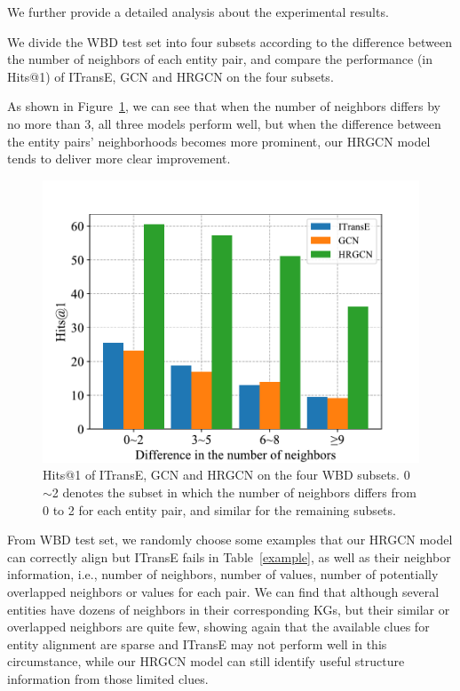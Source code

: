 	We further provide a detailed analysis about the experimental results.
	
	We divide the WBD test set into four subsets according to the difference between the number of neighbors of each entity pair, and compare the performance (in Hits@1) of ITransE, GCN and HRGCN on the four subsets.
	
	As shown in Figure~\ref{subset}, we can see that when the number of neighbors differs by no more than 3, all three models perform well,
	but when the difference between the entity pairs' neighborhoods becomes more prominent,
	our HRGCN model tends to deliver more clear improvement.
	\begin{figure}
		\centering
		\includegraphics[width=1\linewidth]{figures/graph4.pdf}
		\caption{Hits@1 of ITransE, GCN and HRGCN on the four WBD subsets. 0$\sim$2 denotes the subset in which the number of neighbors differs from 0 to 2 for each entity pair, and similar for the remaining subsets.}
		\label{subset}
	\end{figure}
	From WBD test set, we randomly choose some examples that our HRGCN model can correctly align but ITransE fails in Table~\ref{example}, as well as their neighbor information, i.e., number of neighbors, number of values, number of potentially overlapped neighbors or values for each pair.
	We can find that although several entities have dozens of neighbors in their corresponding KGs, but their similar or overlapped neighbors are quite few, showing again that
	the available clues for entity alignment are sparse and ITransE may not perform well in this circumstance, while our HRGCN model can still identify useful structure information from those limited clues.
	
